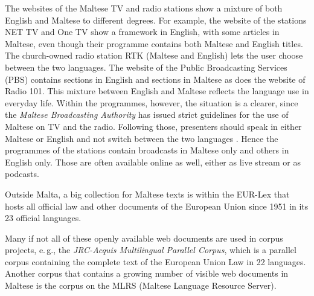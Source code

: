 \documentclass[]{../../metanetpaper}
\begin{document}
\begin{multicols}{2}
The websites of the Maltese TV and radio stations show a mixture of both English and Maltese to different degrees. For example, the website of the stations NET TV\cite{NetTV1} and One TV\cite{OneTV1} show a framework in English, with some articles in Maltese, even though their programme contains both Maltese and English titles. The church-owned radio station RTK\cite{RTK1/} (Maltese and English) lets the user choose between the two languages. The website of the Public Broadcasting Services (PBS)\cite{PBS1} contains sections in English and sections in Maltese as does the website of Radio 101\cite{radio101}. This mixture between English and Maltese reflects the language use in everyday life. Within the programmes, however, the situation is a clearer, since the \emph{Maltese Broadcasting Authority} has issued strict guidelines for the use of Maltese on TV and the radio. Following those, presenters should speak in either Maltese or English and not switch between the two languages \cite{Fabri:2011}. Hence the programmes of the stations contain broadcasts in Maltese only and others in English only. Those are often available online as well, either as live stream or as podcasts.

Outside Malta, a big collection for Maltese texts is within the EUR-Lex\cite{EURLex1} that hosts all official law and other documents of the European Union since 1951 in its 23 official languages.

Many if not all of these openly available web documents are used in corpus projects, e.\,g., the \emph{JRC-Acquis Multilingual Parallel Corpus}\cite{JRC-Acquis1}, which is a parallel corpus containing the complete text of the European Union Law in 22 languages. Another corpus that contains a growing number of visible web documents in Maltese is the corpus on the MLRS (Maltese Language Resource Server)\cite{MLRS1}.
\end{multicols}

\clearpage

\end{document}
